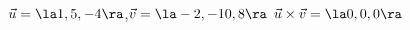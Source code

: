 {$\vec u = \la 1,5,-4\ra$,\quad $\vec v = \la -2,-10,8\ra$
}
{$\vec u\times\vec v = \la 0,0,0\ra$
}
